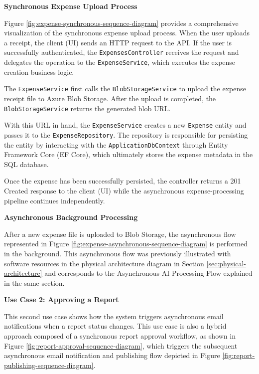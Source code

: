 \textbf{Synchronous Expense Upload Process}

Figure \ref{fig:expense-synchronous-sequence-diagram} provides a comprehensive visualization of the synchronous expense upload process. When the user uploads a receipt, the client (UI) sends an HTTP request to the API. If the user is successfully authenticated, the \texttt{ExpensesController} receives the request and delegates the operation to the \texttt{ExpenseService}, which executes the expense creation business logic.

The \texttt{ExpenseService} first calls the \texttt{BlobStorageService} to upload the expense receipt file to Azure Blob Storage. After the upload is completed, the \texttt{BlobStorageService} returns the generated blob URL. 

With this URL in hand, the \texttt{ExpenseService} creates a new \texttt{Expense} entity and passes it to the \texttt{ExpenseRepository}. The repository is responsible for persisting the entity by interacting with the \texttt{ApplicationDbContext} through Entity Framework Core (EF Core), which ultimately stores the expense metadata in the SQL database.

Once the expense has been successfully persisted, the controller returns a 201 Created response to the client (UI) while the asynchronous expense-processing pipeline continues independently.

\textbf{Asynchronous Background Processing}

After a new expense file is uploaded to Blob Storage, the asynchronous flow represented in Figure \ref{fig:expense-asynchronous-sequence-diagram} is performed in the background. This asynchronous flow was previously illustrated with software resources in the physical architecture diagram in Section \ref{sec:physical-architecture} and corresponds to the Asynchronous AI Processing Flow explained in the same section.

\vspace{1cm}

\textbf{Use Case 2: Approving a Report}

This second use case shows how the system triggers asynchronous email notifications when a report status changes. This use case is also a hybrid approach composed of a synchronous report approval workflow, as shown in Figure \ref{fig:report-approval-sequence-diagram}, which triggers the subsequent asynchronous email notification and publishing flow depicted in Figure \ref{fig:report-publishing-sequence-diagram}.


